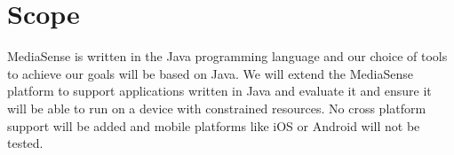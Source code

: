 \section{Scope}
MediaSense is written in the Java programming language and our choice of tools to achieve our goals will be based on Java. We will extend the MediaSense platform to support applications written in Java and evaluate it and ensure it will be able to run on a device with constrained resources. No cross platform support will be added and mobile platforms like iOS or Android will not be tested.
